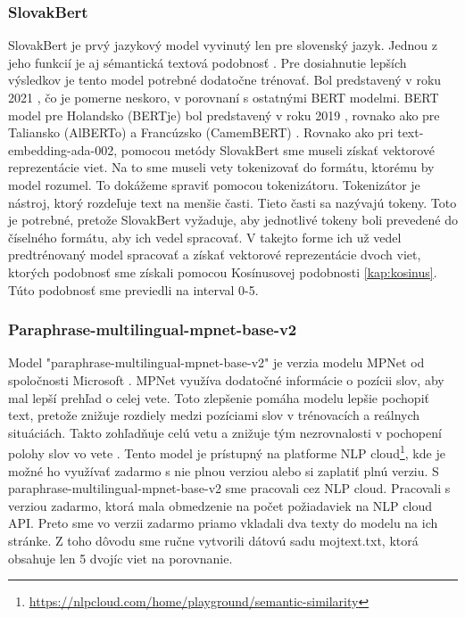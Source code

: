 \subsubsection{SlovakBert}
\label{kap:bertik}
SlovakBert je prvý jazykový model vyvinutý len pre slovenský jazyk. Jednou z jeho funkcií je aj sémantická textová podobnosť \cite{slovakbert_uvod}. Pre dosiahnutie lepších výsledkov je tento model potrebné dodatočne trénovať.
Bol  predstavený v roku 2021 \cite{slovakbert_uvod2}, čo je pomerne neskoro, v porovnaní s ostatnými BERT modelmi. BERT model pre Holandsko (BERTje) bol predstavený v roku 2019 \cite{dutchbert}, rovnako ako pre Taliansko (AlBERTo) \cite{alberto} a Francúzsko (CamemBERT) \cite{camembert}. Rovnako ako pri text-embedding-ada-002, pomocou metódy SlovakBert sme museli získať vektorové reprezentácie viet. Na to sme museli vety tokenizovať do formátu, ktorému by model rozumel. To dokážeme spraviť pomocou tokenizátoru. Tokenizátor je nástroj, ktorý rozdeľuje text na menšie časti. Tieto časti sa nazývajú tokeny. Toto je potrebné, pretože SlovakBert vyžaduje, aby jednotlivé tokeny boli prevedené do číselného formátu, aby ich vedel spracovať. V takejto forme ich už vedel predtrénovaný model spracovať a získať vektorové reprezentácie dvoch viet, ktorých podobnosť sme získali pomocou Kosínusovej podobnosti \ref{kap:kosinus}. Túto podobnosť sme previedli na interval 0-5.

\subsubsection{Paraphrase-multilingual-mpnet-base-v2}
Model "paraphrase-multilingual-mpnet-base-v2" je verzia modelu MPNet od spoločnosti Microsoft \cite{paraphrase}. MPNet  využíva dodatočné informácie o pozícii slov, aby mal lepší prehľad o celej vete. Toto zlepšenie pomáha modelu lepšie pochopiť text, pretože znižuje rozdiely medzi pozíciami slov v trénovacích a reálnych situáciách. Takto zohľadňuje celú vetu a znižuje tým nezrovnalosti v pochopení polohy slov vo vete \cite{mpnet}. Tento model je prístupný na platforme NLP cloud\footnote{\url{https://nlpcloud.com/home/playground/semantic-similarity}}, kde je možné ho využívať zadarmo s nie plnou verziou alebo si zaplatiť plnú verziu.  S paraphrase-multilingual-mpnet-base-v2 sme pracovali cez NLP cloud. Pracovali s verziou zadarmo, ktorá mala obmedzenie na počet požiadaviek na NLP cloud API. Preto sme vo verzii zadarmo priamo vkladali dva texty do modelu na ich stránke. Z toho dôvodu sme ručne vytvorili dátovú sadu mojtext.txt, ktorá obsahuje len 5 dvojíc viet na porovnanie. 

